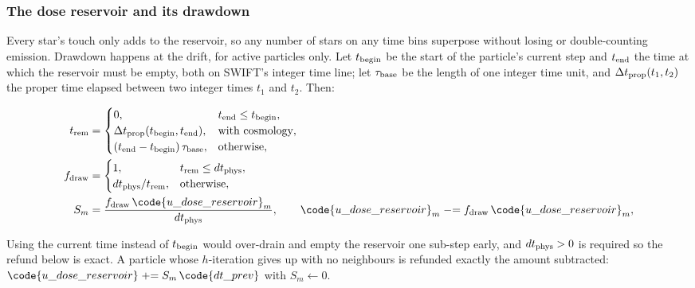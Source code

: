 \subsubsection{The dose reservoir and its drawdown}
\label{sec:isrfd-reservoir}

Every star's touch only adds to the reservoir, so any number of stars on any
time bins superpose without losing or double-counting emission.
Drawdown happens at the drift, for active particles only. Let
$t_{\rm begin}$ be the start of the particle's current step and $t_{\rm end}$
the time at which the reservoir must be empty, both on SWIFT's integer time
line; let $\tau_{\rm base}$ be the length of one integer time unit, and
$\Delta t_{\rm prop}(t_1, t_2)$ the proper time elapsed between two integer
times $t_1$ and $t_2$. Then:

\begin{align}
  t_{\rm rem} &=
    \begin{cases}
      0, & t_{\rm end} \le t_{\rm begin},\\
      \Delta t_{\rm prop}(t_{\rm begin}, t_{\rm end}), & \text{with cosmology},\\
      (t_{\rm end} - t_{\rm begin})\,\tau_{\rm base}, & \text{otherwise},
    \end{cases}
  \label{eq:isrfd-trem} \\
  f_{\rm draw} &=
    \begin{cases}
      1, & t_{\rm rem} \le dt_{\rm phys},\\
      dt_{\rm phys}/t_{\rm rem}, & \text{otherwise},
    \end{cases}
  \label{eq:isrfd-fdraw} \\
  S_m &= \frac{f_{\rm draw}\, \code{u\_dose\_reservoir}_m}{dt_{\rm phys}},
  \qquad
  \code{u\_dose\_reservoir}_m \mathrel{-}= f_{\rm draw}\, \code{u\_dose\_reservoir}_m,
  \label{eq:isrfd-drawdown}
\end{align}

Using the current time
instead of $t_{\rm begin}$ would over-drain and empty
the reservoir one sub-step early, and
$dt_{\rm phys} > 0$ is required so the refund below is exact. A particle whose
$h$-iteration gives up with
no neighbours is refunded exactly the amount subtracted:
$\code{u\_dose\_reservoir} \mathrel{+}= S_m\, \code{dt\_prev}$ with
$S_m \leftarrow 0$.

